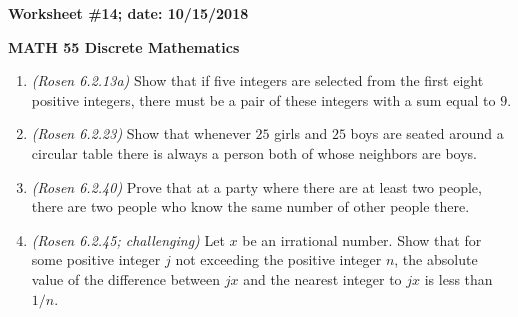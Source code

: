\documentclass{article}
\begin{document}
{\bf Worksheet \#14; date: 10/15/2018}

{\bf MATH 55 Discrete Mathematics}

\begin{enumerate}
\item {\em (Rosen 6.2.13a)} Show that if five integers are selected from the first eight positive integers, there must be a pair of these integers with a sum equal to $9$.

\item {\em (Rosen 6.2.23)} Show that whenever $25$ girls and $25$ boys are seated around a circular table there is always a person both of whose neighbors are boys.

\item {\em (Rosen 6.2.40)} Prove that at a party where there are at least two people, there are two people who know the same number of other people there.

\item {\em (Rosen 6.2.45; challenging)} Let $x$ be an irrational number. Show that for some positive integer $j$ not exceeding the positive integer $n$, the absolute value of the difference between $jx$ and the nearest integer to $jx$ is less than $1/n$.
\end{enumerate}
\end{document}
